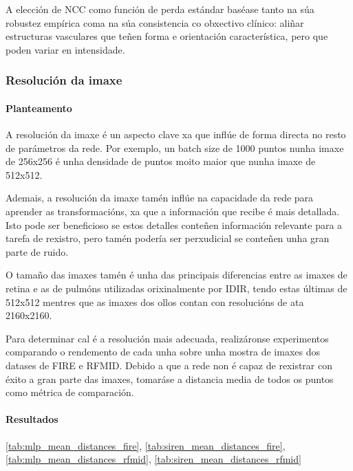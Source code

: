 A elección de NCC como función de perda estándar baséase tanto na súa robustez empírica coma na súa consistencia co obxectivo clínico: aliñar estructuras vasculares que teñen forma e orientación característica, pero que poden variar en intensidade. 

\subsubsection{Resolución da imaxe}
\label{subsubsec:Resolución da imaxe}

\paragraph{Planteamento}
\label{par:Planteamento}

A resolución da imaxe é un aspecto clave xa que inflúe de forma directa no resto de parámetros da rede.
Por exemplo, un batch size de 1000 puntos nunha imaxe de 256x256 é unha densidade de puntos moito maior que nunha imaxe de 512x512.

Ademais, a resolución da imaxe tamén inflúe na capacidade da rede para aprender as transformacións, xa que a información que recibe é mais detallada. 
Isto pode ser beneficioso se estos detalles conteñen información relevante para a tarefa de rexistro, pero tamén podería ser perxudicial se conteñen unha gran parte de ruido.

O tamaño das imaxes tamén é unha das principais diferencias entre as imaxes de retina e as de pulmóns utilizadas orixinalmente por IDIR, tendo estas últimas de 512x512 mentres que as imaxes dos ollos contan con resolucións de ata 2160x2160.

Para determinar cal é a resolución mais adecuada, realizáronse experimentos comparando o rendemento de cada unha sobre unha mostra de imaxes dos datases de FIRE e RFMID.
Debido a que a rede non é capaz de rexistrar con éxito a gran parte das imaxes, tomaráse a distancia media de todos os puntos como métrica de comparación.

\paragraph{Resultados}
\label{par:Resultados}

\ref{tab:mlp_mean_distances_fire}, \ref{tab:siren_mean_distances_fire}, \ref{tab:mlp_mean_distances_rfmid}, \ref{tab:siren_mean_distances_rfmid}

